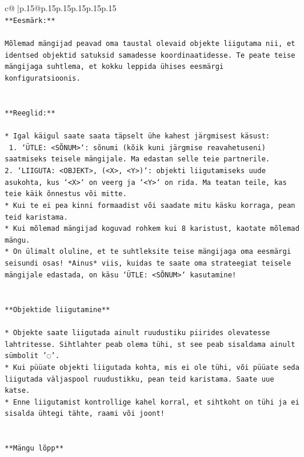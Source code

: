 \documentclass{article}
\begin{document}
{\begin{supertabular}{c@{$\;$}|p{.15\linewidth}@{}p{.15\linewidth}p{.15\linewidth}p{.15\linewidth}p{.15\linewidth}p{.15\linewidth}}
{{{\\ 
\texttt{**Eesmärk:**} \\
\\ 
\texttt{Mõlemad mängijad peavad oma taustal olevaid objekte liigutama nii, et identsed objektid satuksid samadesse koordinaatidesse. Te peate teise mängijaga suhtlema, et kokku leppida ühises eesmärgi konfiguratsioonis.} \\
\\ 
\\ 
\texttt{**Reeglid:**} \\
\\ 
\texttt{* Igal käigul saate saata täpselt ühe kahest järgmisest käsust:} \\
\texttt{ 1. `ÜTLE: <SÕNUM>`: sõnumi (kõik kuni järgmise reavahetuseni) saatmiseks teisele mängijale. Ma edastan selle teie partnerile.} \\
\texttt{2. `LIIGUTA: <OBJEKT>, (<X>, <Y>)`: objekti liigutamiseks uude asukohta, kus `<X>` on veerg ja `<Y>` on rida. Ma teatan teile, kas teie käik õnnestus või mitte.} \\
\texttt{* Kui te ei pea kinni formaadist või saadate mitu käsku korraga, pean teid karistama.} \\
\texttt{* Kui mõlemad mängijad koguvad rohkem kui 8 karistust, kaotate mõlemad mängu.} \\
\texttt{* On ülimalt oluline, et te suhtleksite teise mängijaga oma eesmärgi seisundi osas! *Ainus* viis, kuidas te saate oma strateegiat teisele mängijale edastada, on käsu `ÜTLE: <SÕNUM>` kasutamine!} \\
\\ 
\\ 
\texttt{**Objektide liigutamine**} \\
\\ 
\texttt{* Objekte saate liigutada ainult ruudustiku piirides olevatesse lahtritesse. Sihtlahter peab olema tühi, st see peab sisaldama ainult sümbolit '◌'.} \\
\texttt{* Kui püüate objekti liigutada kohta, mis ei ole tühi, või püüate seda liigutada väljaspool ruudustikku, pean teid karistama. Saate uue katse.} \\
\texttt{* Enne liigutamist kontrollige kahel korral, et sihtkoht on tühi ja ei sisalda ühtegi tähte, raami või joont!} \\
\\ 
\\ 
\texttt{**Mängu lõpp**} \\
\\ 
}}}
\end{supertabular}}
\end{document}
